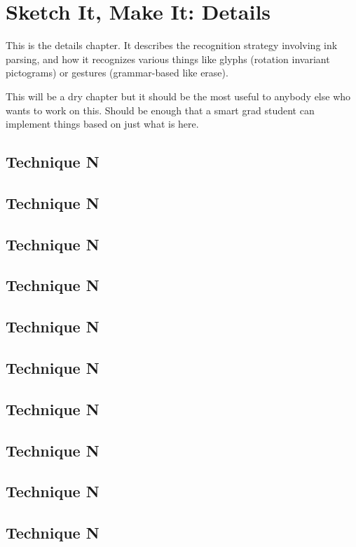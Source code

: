 \chapter{Sketch It, Make It: Details}

This is the details chapter. It describes the recognition strategy
involving ink parsing, and how it recognizes various things like
glyphs (rotation invariant pictograms) or gestures (grammar-based like
erase).

This will be a dry chapter but it should be the most useful to anybody
else who wants to work on this. Should be enough that a smart grad
student can implement things based on just what is here.

\section{Technique N}

\section{Technique N}

\section{Technique N}

\section{Technique N}

\section{Technique N}

\section{Technique N}

\section{Technique N}

\section{Technique N}

\section{Technique N}

\section{Technique N}

